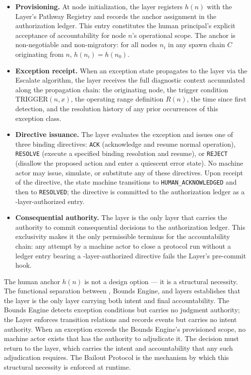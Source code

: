 \begin{itemize}\itemsep=0pt
\item[(\textit{i})] \textbf{Provisioning.} At node initialization, the \purpose{} layer registers $h(n)$ with the \fact{} Layer's Pathway Registry and records the anchor assignment in the authorization ledger. This entry constitutes the human principal's explicit acceptance of accountability for node $n$'s operational scope. The anchor is non-negotiable and non-migratory: for all nodes $n_i$ in any spawn chain $C$ originating from $n$, $h(n_i) = h(n_0)$.

\item[(\textit{ii})] \textbf{Exception receipt.} When an exception state propagates to the \purpose{} layer via the Escalate algorithm, the \purpose{} layer receives the full diagnostic context accumulated along the propagation chain: the originating node, the trigger condition $\text{TRIGGER}(n, x)$, the operating range definition $R(n)$, the time since first detection, and the resolution history of any prior occurrences of this exception class.

\item[(\textit{iii})] \textbf{Directive issuance.} The \purpose{} layer evaluates the exception and issues one of three binding directives: \texttt{ACK} (acknowledge and resume normal operation), \texttt{RESOLVE} (execute a specified binding resolution and resume), or \texttt{REJECT} (disallow the proposed action and enter a quiescent error state). No machine actor may issue, simulate, or substitute any of these directives. Upon receipt of the directive, the state machine transitions to \texttt{HUMAN\_ACKNOWLEDGED} and then to \texttt{RESOLVED}; the directive is committed to the authorization ledger as a \purpose{}-layer-authorized entry.

\item[(\textit{iv})] \textbf{Consequential authority.} The \purpose{} layer is the only layer that carries the authority to commit consequential decisions to the authorization ledger. This exclusivity makes it the only permissible terminus for the accountability chain: any attempt by a machine actor to close a protocol run without a ledger entry bearing a \purpose{}-layer-authorized directive fails the \fact{} Layer's pre-commit hook.
\end{itemize}

The human anchor $h(n)$ is not a design option — it is a structural necessity. The functional separation between \purpose{}, Bounds Engine, and \fact{} layers establishes that the \purpose{} layer is the only layer carrying both intent and final accountability. The Bounds Engine detects exception conditions but carries no judgment authority; the \fact{} Layer enforces transition relations and records events but carries no intent authority. When an exception exceeds the Bounds Engine's provisioned scope, no machine actor exists that has the authority to adjudicate it. The decision must return to the \purpose{} layer, which carries the intent and accountability that any such adjudication requires. The Bailout Protocol is the mechanism by which this structural necessity is enforced at runtime.

